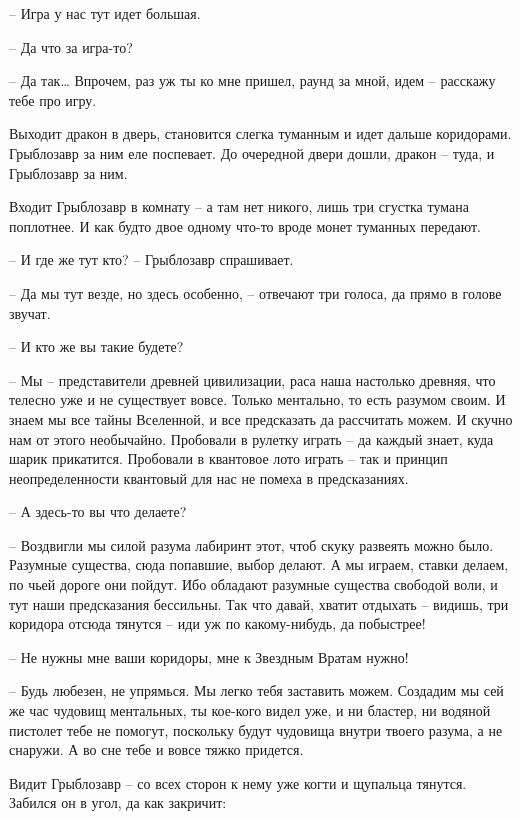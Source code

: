 \documentclass[ebook,oneside,final,openright]{memoir}
\begin{document}
– Игра у нас тут идет большая.\par
– Да что за игра-то?\par
– Да так… Впрочем, раз уж ты ко мне пришел, раунд за мной, идем – расскажу тебе про игру.\par
\par
Выходит дракон в дверь, становится слегка туманным и идет дальше коридорами. Грыблозавр за ним еле поспевает. До очередной двери дошли, дракон – туда, и Грыблозавр за ним. \par
Входит Грыблозавр в комнату – а там нет никого, лишь три сгустка тумана поплотнее. И как будто двое одному что-то вроде монет туманных передают.\par
– И где же тут кто? – Грыблозавр спрашивает.\par
– Да мы тут везде, но здесь особенно, – отвечают три голоса, да прямо в голове звучат.\par
– И кто же вы такие будете?\par
– Мы – представители древней цивилизации, раса наша настолько древняя, что телесно уже и не существует вовсе. Только ментально, то есть разумом своим. И знаем мы все тайны Вселенной, и все предсказать да рассчитать можем. И скучно нам от этого необычайно. Пробовали в рулетку играть – да каждый знает, куда шарик прикатится. Пробовали в квантовое лото играть – так и принцип неопределенности квантовый для нас не помеха в предсказаниях.\par
– А здесь-то вы что делаете?\par
– Воздвигли мы силой разума лабиринт этот, чтоб скуку развеять можно было. Разумные существа, сюда попавшие, выбор делают. А мы играем, ставки делаем, по чьей дороге они пойдут. Ибо обладают разумные существа свободой воли, и тут наши предсказания бессильны. Так что давай, хватит отдыхать – видишь, три коридора отсюда тянутся – иди уж по какому-нибудь, да побыстрее!\par
– Не нужны мне ваши коридоры, мне к Звездным Вратам нужно!\par
– Будь любезен, не упрямься. Мы легко тебя заставить можем. Создадим мы сей же час чудовищ ментальных, ты кое-кого видел уже, и ни бластер, ни водяной пистолет тебе не помогут, поскольку будут чудовища внутри твоего разума, а не снаружи. А во сне тебе и вовсе тяжко придется.\par
\par
Видит Грыблозавр – со всех сторон к нему уже когти и щупальца тянутся. Забился он в угол, да как закричит:\par
\end{document}
